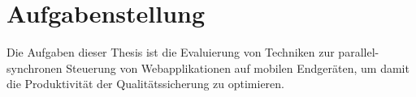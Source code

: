 \documentclass[13pt,a4paper,oneside]{scrbook} %
\newcommand{\tr}[1]{TOREMOVE-->\linebreak{#1} \linebreak <--TOREMOVE}
\renewcommand{\\}{\bigskip}
\begin{document}
\pagestyle{fancy}

\maketitle








\tableofcontents

\listoffigures

\listoftables




\chapter{Aufgabenstellung}
Die Aufgaben dieser Thesis ist die Evaluierung von Techniken zur parallel-synchronen Steuerung von Webapplikationen auf mobilen Endgeräten, um damit die Produktivität der Qualitätssicherung zu optimieren.
\end{document}
